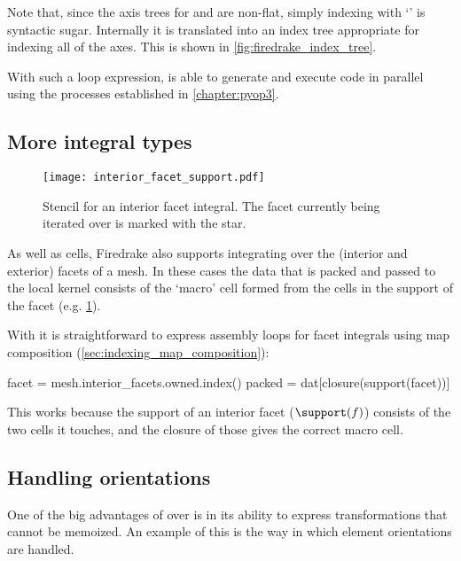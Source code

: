 \documentclass[thesis]{subfiles}
\begin{document}
Note that, since the axis trees for  and  are non-flat, simply indexing with `' is syntactic sugar.
Internally it is translated into an index tree appropriate for indexing all of the axes.
This is shown in \cref{fig:firedrake_index_tree}.

With such a loop expression,  is able to generate and execute code in parallel using the processes established in \cref{chapter:pyop3}.

\subsection{More integral types}

\begin{figure}
  \centering
  \texttt{[image: interior\_facet\_support.pdf]}
  \caption{
    Stencil for an interior facet integral.
    The facet currently being iterated over is marked with the star.
  }
  \label{fig:interior_facet_support}
\end{figure}

As well as cells, Firedrake also supports integrating over the (interior and exterior) facets of a mesh.
In these cases the data that is packed and passed to the local kernel consists of the `macro' cell formed from the cells in the support of the facet (e.g. \cref{fig:interior_facet_support}).

With  it is straightforward to express assembly loops for facet integrals using map composition (\cref{sec:indexing_map_composition}):
\begin{pyinline}
  facet = mesh.interior_facets.owned.index()
  packed = dat[closure(support(facet))]
\end{pyinline}
This works because the support of an interior facet ($\support(f)$) consists of the two cells it touches, and the closure of those gives the correct macro cell.

\subsection{Handling orientations}

One of the big advantages of  over  is in its ability to express transformations that cannot be memoized.
An example of this is the way in which element orientations are handled.

\end{document}

